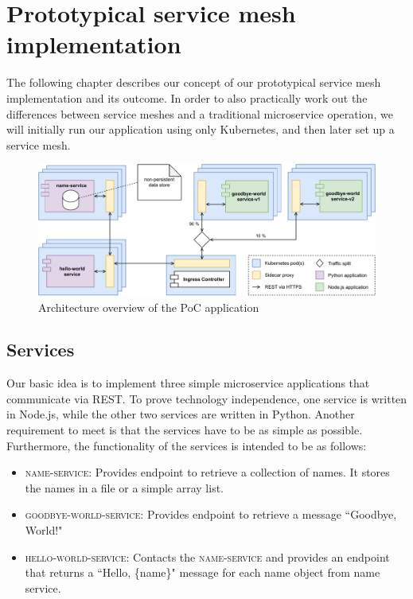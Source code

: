 \section{Prototypical service mesh implementation}

The following chapter describes our concept of our prototypical service mesh implementation and its outcome. In order to also practically work out the differences between service meshes and a traditional microservice operation, we will initially run our application using only Kubernetes, and then later set up a service mesh.

\begin{figure}
    \centering
    \includegraphics[width=\textwidth]{img/diagram-draft.pdf}
    \caption{Architecture overview of the PoC application}
    \label{fig:poc-overview}
\end{figure}

\subsection{Services}

Our basic idea is to implement three simple microservice applications that communicate via REST. To prove technology independence, one service is written in Node.js, while the other two services are written in Python. Another requirement to meet is that the services have to be as simple as possible. Furthermore, the functionality of the services is intended to be as follows:

\begin{itemize}
\item \textsc{name-service}: Provides endpoint to retrieve a collection of names. It stores the names in a file or a simple array list.
\item \textsc{goodbye-world-service}: Provides endpoint to retrieve a message ``Goodbye, World!"
\item \textsc{hello-world-service}: Contacts the \textsc{name-service} and provides an endpoint that returns a ``Hello, \{name\}" message for each name object from name service.
\end{itemize}


